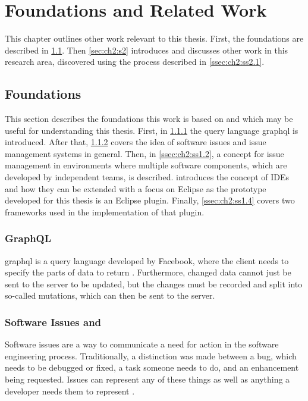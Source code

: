 
\chapter{Foundations and Related Work}
\label{chap:ch2}
This chapter outlines other work relevant to this thesis.
First, the foundations are described in \cref{sec:ch2:s1}.
Then \cref{sec:ch2:s2} introduces and discusses other work in this research area, 
discovered using the process described in \cref{ssec:ch2:ss2.1}.

\section{Foundations}
\label{sec:ch2:s1}
This section describes the foundations this work is based on and which may be useful for understanding this thesis.
First, in \cref{ssec:ch2:ss1.0} the query language \gls{graphql} is  introduced.
After that, \cref{ssec:ch2:ss1.1} covers the idea of software issues and issue management systems in general.
Then, in \cref{ssec:ch2:ss1.2}, a concept for issue management in environments where multiple software components, 
which are developed by independent teams, is described.
 introduces the concept of \glspl{IDE} and how they can be extended 
with a focus on \gls{Eclipse} as the prototype developed for this thesis is an \gls{Eclipse} plugin.
Finally, \cref{ssec:ch2:ss1.4} covers two frameworks used in the implementation of that plugin.

\subsection{GraphQL}
\label{ssec:ch2:ss1.0}
\gls{graphql} is a query language developed by Facebook, where the client needs to specify the parts of data to return \cite{grpahql2018}.
Furthermore, changed data cannot just be sent to the server to be updated, but the changes must be recorded and split into so-called mutations,
which can then be sent to the server.

\subsection{Software Issues and }
\label{ssec:ch2:ss1.1}
Software issues are a way to communicate a need for action in the software engineering process.
Traditionally, a distinction was made between a bug, which needs to be debugged or fixed, a task someone needs to do, 
and an enhancement being requested.
Issues can represent any of these things as well as anything a developer needs them to represent \cite{Atlassian2020Issue,Github2020Issues}.

